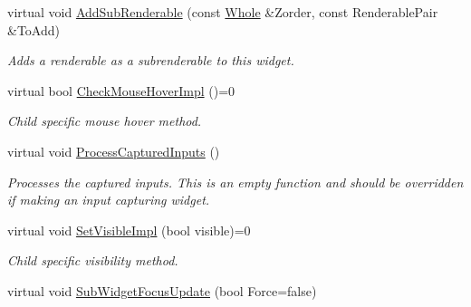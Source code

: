 \begin{DoxyCompactItemize}
\item 
\hypertarget{classMezzanine_1_1UI_1_1Widget_a32580e1c8fee300be0f2d72e2b863fb0}{
virtual void \hyperlink{classMezzanine_1_1UI_1_1Widget_a32580e1c8fee300be0f2d72e2b863fb0}{AddSubRenderable} (const \hyperlink{namespaceMezzanine_adcbb6ce6d1eb4379d109e51171e2e493}{Whole} \&Zorder, const RenderablePair \&ToAdd)}
\label{classMezzanine_1_1UI_1_1Widget_a32580e1c8fee300be0f2d72e2b863fb0}

\begin{DoxyCompactList}\small\item\em Adds a renderable as a subrenderable to this widget. \item\end{DoxyCompactList}\item 
\hypertarget{classMezzanine_1_1UI_1_1Widget_adb2f2020d4a3bfef6c76e5ac0fdf26cb}{
virtual bool \hyperlink{classMezzanine_1_1UI_1_1Widget_adb2f2020d4a3bfef6c76e5ac0fdf26cb}{CheckMouseHoverImpl} ()=0}
\label{classMezzanine_1_1UI_1_1Widget_adb2f2020d4a3bfef6c76e5ac0fdf26cb}

\begin{DoxyCompactList}\small\item\em Child specific mouse hover method. \item\end{DoxyCompactList}\item 
\hypertarget{classMezzanine_1_1UI_1_1Widget_ab4aadd7cef4beda4f13b4c4918209a5f}{
virtual void \hyperlink{classMezzanine_1_1UI_1_1Widget_ab4aadd7cef4beda4f13b4c4918209a5f}{ProcessCapturedInputs} ()}
\label{classMezzanine_1_1UI_1_1Widget_ab4aadd7cef4beda4f13b4c4918209a5f}

\begin{DoxyCompactList}\small\item\em Processes the captured inputs. This is an empty function and should be overridden if making an input capturing widget. \item\end{DoxyCompactList}\item 
\hypertarget{classMezzanine_1_1UI_1_1Widget_a766e29f02a4d6640812462e4a8bdb272}{
virtual void \hyperlink{classMezzanine_1_1UI_1_1Widget_a766e29f02a4d6640812462e4a8bdb272}{SetVisibleImpl} (bool visible)=0}
\label{classMezzanine_1_1UI_1_1Widget_a766e29f02a4d6640812462e4a8bdb272}

\begin{DoxyCompactList}\small\item\em Child specific visibility method. \item\end{DoxyCompactList}\item 
\hypertarget{classMezzanine_1_1UI_1_1Widget_afc1b4bcc448e9ecf977a987c9b348547}{
virtual void \hyperlink{classMezzanine_1_1UI_1_1Widget_afc1b4bcc448e9ecf977a987c9b348547}{SubWidgetFocusUpdate} (bool Force=false)}
\label{classMezzanine_1_1UI_1_1Widget_afc1b4bcc448e9ecf977a987c9b348547}


\end{DoxyCompactItemize}
